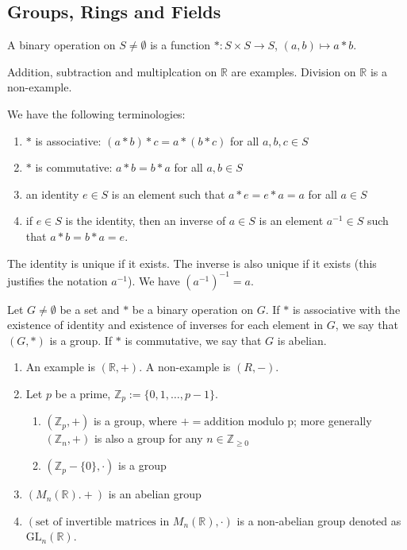 \documentclass{scrartcl}
\def\ge{\geqslant}
\def\Z{\mathbb{Z}}
\def\R{\mathbb{R}}
\begin{document}
\subsection{Groups, Rings and Fields}
\begin{definition}
	A binary operation on $S \ne \emptyset$ is a function $*: S\times S \to S$, $(a, b) \mapsto a * b$. 
\end{definition}
\begin{remark}
	Addition, subtraction and multiplcation on $\R$ are examples. Division on $\R$ is a non-example. 
\end{remark}
\begin{definition}
	We have the following terminologies:
	\begin{enumerate}
		\item $*$ is associative: $(a*b)*c = a*(b*c)$ for all $a, b, c \in S$
		\item $*$ is commutative: $a*b = b*a$ for all $a, b \in S$
		\item an identity $e \in S$ is an element such that $a*e = e*a = a$ for all $a \in S$
		\item if $e\in S$ is the identity, then an inverse of $a \in S$ is an element $a^{-1} \in S$ such that $a*b = b*a = e$. 
	\end{enumerate}
\end{definition}
\begin{remark}
	The identity is unique if it exists. The inverse is also unique if it exists (this justifies the notation $a^{-1}$). We have $(a^{-1})^{-1} = a$.
\end{remark}
\begin{definition}
	Let $G \ne \emptyset$ be a set and $*$ be a binary operation on $G$. If $*$ is associative with the existence of identity and existence of inverses for each element in $G$, we say that $(G, *)$ is a group. If $*$ is commutative, we say that $G$ is abelian.
\end{definition}
\begin{example}
	\begin{enumerate}
		\item An example is $(\R, +)$. A non-example is $(R, -)$.
		\item Let $p$ be a prime, $\Z_p := \{0, 1, \dots, p-1\}$.
			\begin{enumerate}
				\item $(\Z_p, +)$ is a group, where $+ = \text{addition modulo p}$; more generally $(\Z_n, +)$ is also a group for any $n \in \Z_{\ge 0}$
				\item $(\Z_p - \{0\}, \cdot)$ is a group
			\end{enumerate} 
		\item $(M_n(\R). +)$ is an abelian group
		\item $(\text{set of invertible matrices in }M_n(\R), \cdot)$ is a non-abelian group denoted as $\text{GL}_n(\R)$. 
	\end{enumerate}
\end{example}
\end{document}
